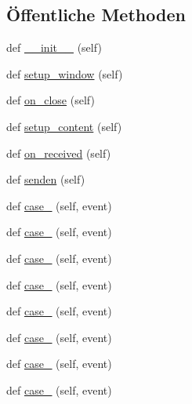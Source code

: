 \subsection*{Öffentliche Methoden}
\begin{DoxyCompactItemize}
\item 
def \hyperlink{class_f_i_n_a_l___g_u_i___w_l_a_n_1_1_w_l_a_n_abd0bb3e25ffdc1d77064fdbe4fae547c}{\+\_\+\+\_\+init\+\_\+\+\_\+} (self)
\item 
def \hyperlink{class_f_i_n_a_l___g_u_i___w_l_a_n_1_1_w_l_a_n_a2253446c57d221d8374f492d3b039edf}{setup\+\_\+window} (self)
\item 
def \hyperlink{class_f_i_n_a_l___g_u_i___w_l_a_n_1_1_w_l_a_n_ae429bf3b670d0b265edc4b1a220d9c6a}{on\+\_\+close} (self)
\item 
def \hyperlink{class_f_i_n_a_l___g_u_i___w_l_a_n_1_1_w_l_a_n_a5fe71f63b3060bb7a5d1511aa0eeaf1c}{setup\+\_\+content} (self)
\item 
def \hyperlink{class_f_i_n_a_l___g_u_i___w_l_a_n_1_1_w_l_a_n_a8a83ac894d6cdbc7a12003dcd2a1d274}{on\+\_\+received} (self)
\item 
def \hyperlink{class_f_i_n_a_l___g_u_i___w_l_a_n_1_1_w_l_a_n_a8dd7e606685fb67b54e2c53626e46fba}{senden} (self)
\item 
def \hyperlink{class_f_i_n_a_l___g_u_i___w_l_a_n_1_1_w_l_a_n_aa39317ec4b35d7765ffbbefa3a341935}{case\+\_} (self, event)
\item 
def \hyperlink{class_f_i_n_a_l___g_u_i___w_l_a_n_1_1_w_l_a_n_ae350f0f04417a03ebbde210d60553283}{case\+\_} (self, event)
\item 
def \hyperlink{class_f_i_n_a_l___g_u_i___w_l_a_n_1_1_w_l_a_n_a7f8af09fe47e662758efbe42031b3fb8}{case\+\_} (self, event)
\item 
def \hyperlink{class_f_i_n_a_l___g_u_i___w_l_a_n_1_1_w_l_a_n_a6a47080307455eebf0bca74834d01077}{case\+\_} (self, event)
\item 
def \hyperlink{class_f_i_n_a_l___g_u_i___w_l_a_n_1_1_w_l_a_n_ab52a928c6ffe8d1e58187b82c485bc41}{case\+\_} (self, event)
\item 
def \hyperlink{class_f_i_n_a_l___g_u_i___w_l_a_n_1_1_w_l_a_n_a508d6895200febe57522b7cb719da925}{case\+\_} (self, event)
\item 
def \hyperlink{class_f_i_n_a_l___g_u_i___w_l_a_n_1_1_w_l_a_n_a49ef4e8a9cf99463eef06e7607511c2f}{case\+\_} (self, event)
\item 
def \hyperlink{class_f_i_n_a_l___g_u_i___w_l_a_n_1_1_w_l_a_n_a3eddec1de07193250a7593ae4dd4b143}{case\+\_} (self, event)

\end{DoxyCompactItemize}
